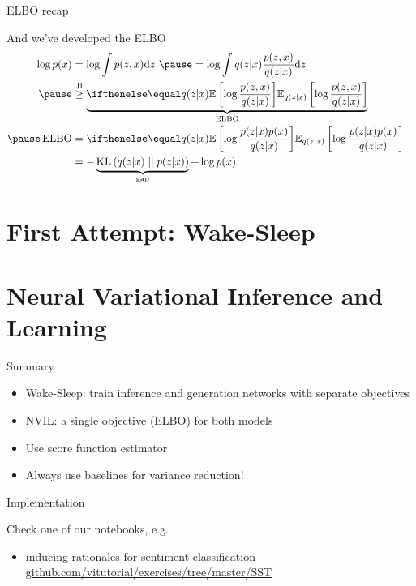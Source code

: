 \begin{frame}{ELBO recap}

And we've developed the ELBO
\begin{equation*}
\begin{aligned}
\log p(x) &= \log \int p(z, x) \dd z ~ \pause = \log \int q(z|x) \frac{p(z, x)}{q(z|x)} \dd z \\ \pause
&\overset{\text{JI}}{\ge} \underbrace{\E[q(z|x)]{\log \frac{p(z, x)}{q(z|x)}} }_{\ELBO} %
& \\ \pause
\ELBO &= \E[q(z|x)]{\log \frac{p(z|x)p(x)}{q(z|x)}} \\
&=-\underbrace{\KL{q(z|x)}{p(z|x)}}_{\text{gap}} + \log p(x)
\end{aligned}
\end{equation*}

\end{frame}


\section{First Attempt: Wake-Sleep}
\frame{\tableofcontents[currentsection]}




\section{Neural Variational Inference and Learning}
\frame{\tableofcontents[currentsection]}



\begin{frame}{Summary}
\begin{itemize}
\item Wake-Sleep: train inference and generation networks with separate objectives
\pause
\item NVIL: a single objective (ELBO) for both models\\ \pause
\item Use score function estimator\\ 
\pause
\item Always use baselines for variance reduction!
\end{itemize}
\end{frame}

\begin{frame}{Implementation}

Check one of our notebooks, e.g.
\begin{itemize}
	\item inducing rationales for sentiment classification \\
\url{github.com/vitutorial/exercises/tree/master/SST}
\end{itemize}


\end{frame}

